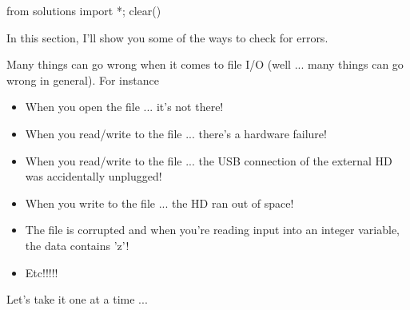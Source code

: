 \begin{python0}
from solutions import *; clear()
\end{python0}

In this section, I'll show you some of the ways to check
for errors.

Many things can go wrong when it comes to file I/O (well ... many things
can go wrong in general). For instance

\begin{itemize}
\item
  When you open the file ... it's not there!
\item
  When you read/write to the file ... there's a hardware failure!
\item
  When you read/write to the file ... the USB connection of the external HD was accidentally unplugged!
\item
  When you write to the file ... the HD ran out of space!
\item
  The file is corrupted and when you're reading input into an integer variable, the data contains 'z'!
\item
  Etc!!!!!
\end{itemize}

Let's take it one at a time ...

